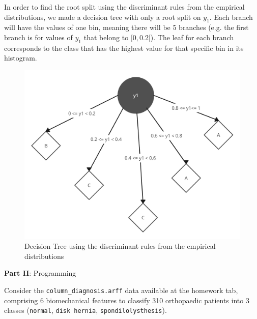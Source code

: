 \documentclass[12pt]{article}
\begin{document}
\begin{enumerate}[leftmargin=\labelsep]
    In order to find the root split using the discriminant rules from the empirical distributions, we made a decision tree with only a root split on $y_1$.
    Each branch will have the values of one bin, meaning there will be 5 branches (e.g. the first branch is for values of $y_1$ that belong to $[0,0.2[$).
    The leaf for each branch corresponds to the class that has the highest value for that specific bin in its histogram.

    \begin{figure}[H]
        \centering
        \includegraphics[width=12cm]{./assets/decision_tree_ex5_PartI.png}
        \caption{Decision Tree using the discriminant rules from the empirical distributions}
        \label{fig:decision-tree-root-split}
    \end{figure}

\end{enumerate}

\vskip 0.5cm

\begin{center}
\large{\textbf{Part II}: Programming}\normalsize
\end{center}

\noindent Consider the \texttt{column\_diagnosis.arff} data available at the homework tab, comprising 6 biomechanical
features to classify 310 orthopaedic patients into 3 classes (\texttt{normal}, \texttt{disk hernia}, \texttt{spondilolysthesis}).
\end{document}
